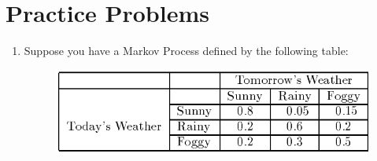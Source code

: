 \documentclass[a4paper]{article}
\begin{document}
\clearpage
\section*{Practice Problems}

\begin{enumerate}
    \item Suppose you have a Markov Process defined by the following table:
        \begin{figure}[h]
            \centering
            \includegraphics[width=.5\textwidth]{figs/sunny-foggy}
        \end{figure}
        

\end{enumerate}
\end{document}
